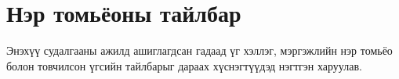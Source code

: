 
\appendix
{}

\chapter{Нэр томьёоны тайлбар}

Энэхүү судалгааны ажилд ашиглагдсан гадаад үг хэллэг, мэргэжлийн нэр томьёо болон товчилсон үгсийн тайлбарыг дараах хүснэгтүүдэд нэгтгэн харуулав.


